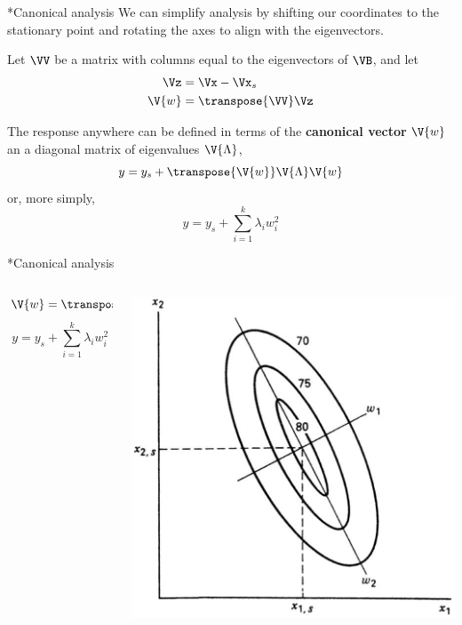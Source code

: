 \documentclass[10pt]{beamer}
\begin{document}
\begin{frame}{*Canonical analysis}
We can simplify analysis by shifting our coordinates to the stationary point and rotating the axes to align with the eigenvectors.

\pause
\medskip
Let $\VV$ be a matrix with columns equal to the eigenvectors of $\VB$, and let
\begin{align*}
	\Vz &= \Vx - \Vx_s \\
	\V{w} &= \transpose{\VV}\Vz	
\end{align*}

\pause
The response anywhere can be defined in terms of the \textbf{canonical vector} $\V{w}$ an a diagonal matrix of eigenvalues $\V{\Lambda}$,
\[ y = y_s + \transpose{\V{w}}\V{\Lambda}\V{w} \]
\pause
or, more simply,
\[ y = y_s + \sum_{i=1}^k \lambda_i w_i^2 \]
\end{frame}

\begin{frame}{*Canonical analysis}
\begin{columns}
\begin{column}{0.3\textwidth}
	\[ \V{w} = \transpose{\VV}(\Vx - \Vx_s) \]
	\[ y = y_s + \sum_{i=1}^k \lambda_i w_i^2 \]
\end{column}
\begin{column}{0.7\textwidth}
	\includegraphics[width=\textwidth]{figures/rsm_canonical_analysis}
\end{column}
\end{columns}	
\end{frame}
\end{document}
